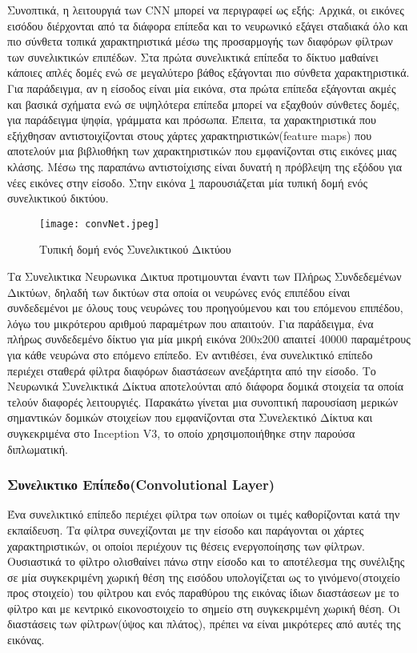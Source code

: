 Συνοπτικά, η λειτουργιά των CNN μπορεί να περιγραφεί ως εξής: Αρχικά, οι εικόνες εισόδου διέρχονται από τα διάφορα επίπεδα και το νευρωνικό  εξάγει σταδιακά όλο και πιο σύνθετα τοπικά χαρακτηριστικά μέσω της προσαρμογής των διαφόρων φίλτρων των συνελικτικών επιπέδων. Στα πρώτα συνελικτικά επίπεδα το δίκτυο μαθαίνει κάποιες απλές δομές ενώ σε μεγαλύτερο βάθος εξάγονται πιο σύνθετα χαρακτηριστικά. Για παράδειγμα, αν η είσοδος  είναι μία εικόνα, στα πρώτα επίπεδα εξάγονται ακμές και βασικά σχήματα ενώ σε υψηλότερα επίπεδα μπορεί να εξαχθούν σύνθετες δομές, για παράδειγμα ψηφία, γράμματα και πρόσωπα. Έπειτα, τα χαρακτηριστικά που εξήχθησαν αντιστοιχίζονται στους χάρτες χαρακτηριστικών(feature maps) που αποτελούν μια βιβλιοθήκη των χαρακτηριστικών  που εμφανίζονται στις εικόνες μιας κλάσης. Μέσω της παραπάνω αντιστοίχισης είναι δυνατή η πρόβλεψη της εξόδου για νέες εικόνες στην είσοδο. Στην εικόνα \ref{figure:convNet} παρουσιάζεται μία τυπική δομή ενός συνελικτικού δικτύου.




\begin{figure}[!h]
    \centering
      \texttt{[image: convNet.jpeg]} \caption{Τυπική δομή ενός Συνελικτικού Δικτύου}
      \label{figure:convNet}    
  \end{figure}


Τα Συνελικτικα Νευρωνικα Δικτυα προτιμουνται έναντι των Πλήρως Συνδεδεμένων Δικτύων, δηλαδή των δικτύων στα οποία οι νευρώνες ενός επιπέδου είναι συνδεδεμένοι με όλους τους νευρώνες του προηγούμενου και του επόμενου επιπέδου, λόγω του μικρότερου αριθμού παραμέτρων που απαιτούν. Για παράδειγμα, ένα πλήρως συνδεδεμένο δίκτυο για μία μικρή εικόνα 200x200 απαιτεί 40000 παραμέτρους για κάθε νευρώνα στο επόμενο επίπεδο. Εν αντιθέσει, ένα συνελικτικό επίπεδο περιέχει σταθερά φίλτρα διαφόρων διαστάσεων ανεξάρτητα από την είσοδο. Το Νευρωνικά Συνελικτικά Δίκτυα αποτελούνται από διάφορα δομικά στοιχεία τα οποία τελούν διαφορές λειτουργιές. Παρακάτω γίνεται μια συνοπτική παρουσίαση μερικών σημαντικών δομικών στοιχείων που εμφανίζονται στα Συνελεκτικό Δίκτυα και συγκεκριμένα στο Inception V3, το οποίο χρησιμοποιήθηκε στην παρούσα διπλωματική.


\subsubsection{Συνελικτικο Επίπεδο(Convolutional Layer)}
\label{subsubsec:3.1.3.1}


Ένα συνελικτικό επίπεδο περιέχει φίλτρα των οποίων οι τιμές καθορίζονται κατά την εκπαίδευση. Τα φίλτρα συνεχίζονται με την είσοδο και παράγονται οι χάρτες χαρακτηριστικών, οι οποίοι περιέχουν τις θέσεις ενεργοποίησης των φίλτρων. Ουσιαστικά το φίλτρο ολισθαίνει πάνω στην είσοδο και το αποτέλεσμα της συνέλιξης σε μία συγκεκριμένη χωρική θέση της εισόδου υπολογίζεται ως το γινόμενο(στοιχείο προς στοιχείο) του φίλτρου και ενός παραθύρου της εικόνας ίδιων διαστάσεων με το φίλτρο και με κεντρικό εικονοστοιχείο το σημείο στη συγκεκριμένη χωρική θέση. Οι διαστάσεις των φίλτρων(ύψος και πλάτος), πρέπει να είναι μικρότερες από αυτές της εικόνας.
 
